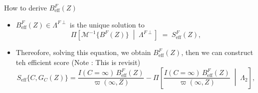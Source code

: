 \documentclass[xcolor=dvipsnames,aspectratio=169]{beamer}
\newcommand{\1}{\mathbbm{1}}
\begin{document}
\begin{frame}{How to derive $B^{F}_{\mathrm{eff}}(Z)$}
  \begin{tcolorbox}[colframe=Cyan,title=Theorem 11.1]
    \begin{itemize}
      \item $B^{F}_{\mathrm{eff}}(Z)\in \Lambda^{F\perp}$ is the unique solution to
      \[
        \Pi\!\left[ \mathcal{M}^{-1}\{B^{F}(Z)\} \;\middle|\; \Lambda^{F\perp} \right]
        \;=\; S^{F}_{\mathrm{eff}}(Z),
      \]
    \end{itemize}
  \end{tcolorbox}
  \begin{itemize}
    \item Thereofore, solving this equation, we obtain $B^{F}_{\mathrm{eff}}(Z)$, then we can construct teh efficient score (Note : This is revisit)
    \[
    S_{\mathrm{eff}}\{C,G_C(Z)\}
=
\frac{I(C=\infty)\,B^{F}_{\mathrm{eff}}(Z)}{\varpi(\infty,Z)}
-
\Pi\!\left[
  \frac{I(C=\infty)\,B^{F}_{\mathrm{eff}}(Z)}{\varpi(\infty,Z)}
  \;\middle|\; \Lambda_2
\right],
    \]
  \end{itemize}
\end{frame}
\end{document}
